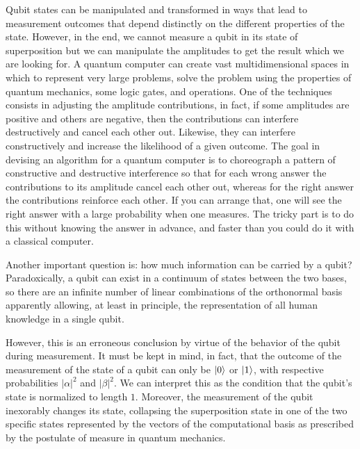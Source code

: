 

Qubit states can be manipulated and transformed in ways that lead to measurement outcomes that depend distinctly on the different properties of the state. 
However, in the end, we cannot measure a qubit in its state of superposition but we can manipulate the amplitudes to get the result which we are looking for.
A quantum computer can create vast multidimensional spaces in which to represent very large problems, solve the problem using the properties of quantum mechanics, some logic gates, and operations. One of the techniques consists in adjusting the amplitude contributions, in fact, if some amplitudes are positive and others are negative, then the contributions can interfere destructively and cancel each other out. %
Likewise, they can interfere constructively and increase the likelihood of a given outcome. The goal in devising an algorithm for a quantum computer is to choreograph a pattern of constructive and destructive interference so that for each wrong answer the contributions to its amplitude cancel each other out, whereas for the right answer the contributions reinforce each other. If you can arrange that, one will see the right answer with a large probability when one measures. The tricky part is to do this without knowing the answer in advance, and faster than you could do it with a classical computer.



Another important question is: how much information can be carried by a qubit?
Paradoxically, a qubit can exist in a continuum of states between the two bases, so there are an infinite number of linear combinations of the orthonormal basis apparently allowing, at least in principle, the representation of all human knowledge in a single qubit.

However, this is an erroneous conclusion by virtue of the behavior of the qubit during measurement. It must be kept in mind, in fact, that the outcome of the measurement of the state of a qubit can only be $\ket{0}$ or $\ket{1}$, with respective probabilities $|\alpha|^2$ and $|\beta|^2$. We can interpret this as the condition that the qubit’s state is normalized to length $1$. 
Moreover, the measurement of the qubit inexorably changes its state, collapsing the superposition state in one of the two specific states represented by the vectors of the computational basis as prescribed by the postulate of measure in quantum mechanics.

